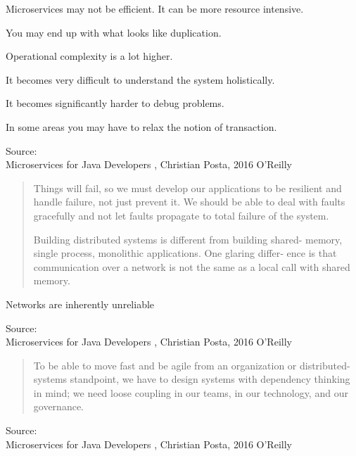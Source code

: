 \documentclass[Screen16to9,17pt]{foils}
\begin{document}

\begin{list2}
\item Microservices may not be efficient. It can be more resource intensive.
\item You may end up with
what looks like duplication.
\item Operational complexity is a lot higher.
\item It becomes very difficult to understand the system holistically.
\item It becomes significantly harder to debug problems.
\item In some areas you may have to relax the notion of transaction.
\end{list2}
Source: {\footnotesize\\
Microservices for Java Developers , Christian Posta, 2016 O’Reilly}





\begin{quote}
  Things will fail, so we must develop our applications to be resilient and handle failure, not just prevent it. We should
  be able to deal with faults gracefully and not let faults propagate to
  total failure of the system.

  Building distributed systems is different from building shared-
memory, single process, monolithic applications. One glaring differ‐
ence is that communication over a network is not the same as a local
call with shared memory.
\end{quote}

\begin{list2}
\item Networks are inherently unreliable
\end{list2}
Source: {\footnotesize\\
Microservices for Java Developers , Christian Posta, 2016 O’Reilly}



\begin{quote}
  To be able to move fast and be agile from an organization or
  distributed-systems standpoint, we have to design systems with
  dependency thinking in mind; we need loose coupling in our teams,
  in our technology, and our governance.
\end{quote}

Source: {\footnotesize\\
Microservices for Java Developers , Christian Posta, 2016 O’Reilly}
\end{document}
